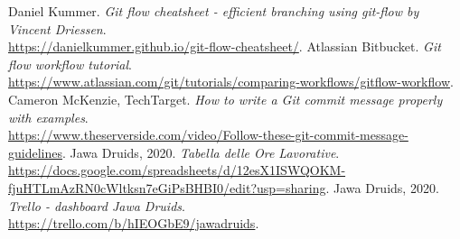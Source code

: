 \begin{thebibliography}{}
    Daniel Kummer.
    \textit{Git flow cheatsheet - efficient branching using git-flow by Vincent Driessen}.\\
		\url{https://danielkummer.github.io/git-flow-cheatsheet/}.
		Atlassian Bitbucket.
		\textit{Git flow workflow tutorial}.\\
		\url{https://www.atlassian.com/git/tutorials/comparing-workflows/gitflow-workflow}.
		Cameron McKenzie, TechTarget.
		\textit{How to write a Git commit message properly with examples}.\\
		\url{https://www.theserverside.com/video/Follow-these-git-commit-message-guidelines}.
		Jawa Druids, 2020.
		\textit{Tabella delle Ore Lavorative}.\\
		\url{https://docs.google.com/spreadsheets/d/12esX1ISWQOKM-fjuHTLmAzRN0cWltksn7eGiPsBHBI0/edit?usp=sharing}.
		Jawa Druids, 2020.
		\textit{Trello - dashboard Jawa Druids}.\\
		\url{https://trello.com/b/hIEOGbE9/jawadruids}.
\end{thebibliography}
